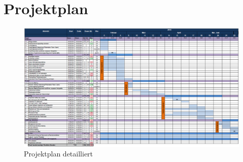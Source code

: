 \pdfpagewidth 420mm
\pdfpageheight 297mm
\section{Projektplan}
\begin{figure}[H]
	\centering
	\includegraphics[scale=0.6,angle=90]{Bilder/Projektplan.png}
	\caption{Projektplan detailliert}
\end{figure}
\pdfpagewidth 210mm
\pdfpageheight 297mm